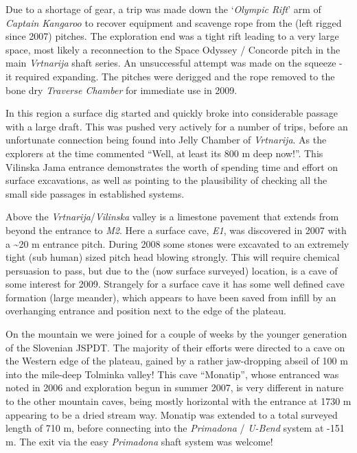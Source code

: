 Due to a shortage of gear, a trip was made down the `\emph{Olympic
Rift}' arm of \emph{Captain Kangaroo} to recover equipment and scavenge
rope from the (left rigged since 2007) pitches. The exploration end was
a tight rift leading to a very large space, most likely a reconnection
to the Space Odyssey / Concorde pitch in the main \emph{Vrtnarija} shaft
series. An unsuccessful attempt was made on the squeeze - it required
expanding. The pitches were derigged and the rope removed to the bone
dry \emph{Traverse Chamber} for immediate use in 2009.

In this region a surface dig started and quickly broke into considerable
passage with a large draft. This was pushed very actively for a number
of trips, before an unfortunate connection being found into Jelly
Chamber of \emph{Vrtnarija}. As the explorers at the time commented
``Well, at least its 800 m deep now!''. This Vilinska Jama entrance
demonstrates the worth of spending time and effort on surface
excavations, as well as pointing to the plausibility of checking all the
small side passages in established systems.

Above the \emph{Vrtnarija}/\emph{Vilinska} valley is a limestone
pavement that extends from beyond the entrance to \emph{M2}. Here a
surface cave, \emph{E1}, was discovered in 2007 with a \textasciitilde20
m entrance pitch. During 2008 some stones were excavated to an extremely
tight (sub human) sized pitch head blowing strongly. This will require
chemical persuasion to pass, but due to the (now surface surveyed)
location, is a cave of some interest for 2009. Strangely for a surface
cave it has some well defined cave formation (large meander), which
appears to have been saved from infill by an overhanging entrance and
position next to the edge of the plateau.

On the mountain we were joined for a couple of weeks by the younger
generation of the Slovenian JSPDT. The majority of their efforts were
directed to a cave on the Western edge of the plateau, gained by a
rather jaw-dropping abseil of 100 m into the mile-deep Tolminka valley!
This cave ``Monatip'', whose entranced was noted in 2006 and exploration
begun in summer 2007, is very different in nature to the other mountain
caves, being mostly horizontal with the entrance at 1730 m appearing to
be a dried stream way. Monatip was extended to a total surveyed length
of 710 m, before connecting into the \emph{Primadona} / \emph{U-Bend}
system at -151 m. The exit via the easy \emph{Primadona} shaft system
was welcome!

